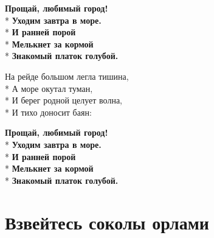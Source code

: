 \begin{minipage}{\linewidth}
\hspace*{1.5em}\textbf{Прощай, любимый город!}\\*
\hspace*{1.5em}\textbf{Уходим завтра в море.}\\*
\hspace*{1.5em}\textbf{И ранней порой}\\*
\hspace*{1.5em}\textbf{Мелькнет за кормой}\\*
\hspace*{1.5em}\textbf{Знакомый платок голубой.}\\
\end{minipage}\par\medskip\nobreak

\medskip

\begin{minipage}{\linewidth}
На рейде большом легла тишина,\\*
А море окутал туман,\\*
И берег родной целует волна,\\*
И тихо доносит баян:\\
\end{minipage}\par\medskip\nobreak

\medskip

\begin{minipage}{\linewidth}
\hspace*{1.5em}\textbf{Прощай, любимый город!}\\*
\hspace*{1.5em}\textbf{Уходим завтра в море.}\\*
\hspace*{1.5em}\textbf{И ранней порой}\\*
\hspace*{1.5em}\textbf{Мелькнет за кормой}\\*
\hspace*{1.5em}\textbf{Знакомый платок голубой.}\\
\end{minipage}

\vspace{\fill}\newpage

\section{Взвейтесь соколы орлами}
\label{song:Взвейтесь_соколы_орлами}

